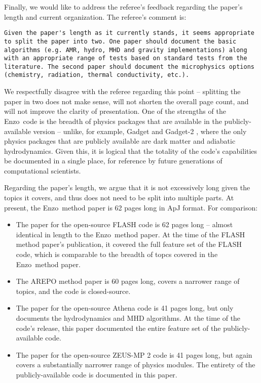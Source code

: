 \documentclass[11pt]{article}
\newcommand{\code}[1]{\textsf{#1}}
\newcommand{\enzo}{\code{Enzo}}
\begin{document}
Finally, we would like to address the referee's feedback regarding the
paper's length and current organization.  The referee's comment is:

\begin{verbatim} 
Given the paper's length as it currently stands, it seems appropriate
to split the paper into two. One paper should document the basic
algorithms (e.g. AMR, hydro, MHD and gravity implementations) along
with an appropriate range of tests based on standard tests from the
literature. The second paper should document the microphysics options
(chemistry, radiation, thermal conductivity, etc.).
\end{verbatim}

We respectfully disagree with the referee regarding this point --
splitting the paper in two does not make sense, will not shorten the
overall page count, and will not improve the clarity of presentation. One of the strengths
of the \enzo\ code is the breadth of physics packages that are
available in the publicly-available version -- unlike, for example,
Gadget and Gadget-2 \citep{2001NewA....6...79S, 2005MNRAS.364.1105S},
where the only physics packages that are publicly available are dark
matter and adiabatic hydrodynamics.  Given this, it is logical that
the totality of the code's capabilities be documented in a single
place, for reference by future generations of computational scientists.

Regarding the paper's length, we argue that it is not excessively long
given the topics it covers, and thus does not need to be split into
multiple parts.  At present, the \enzo\ method paper is 62 pages long
in ApJ format.
For comparison:

\begin{itemize}
\item The paper for the open-source FLASH code
\citep{2000ApJS..131..273F} is 62 pages long -- almost identical in
length to the \enzo\ method paper.  At the time of the FLASH method paper's
publication, it covered the full feature set of the FLASH code, which
is comparable to the breadth of topcs covered in the \enzo\ method
paper.

\item The AREPO method paper \citep{2010MNRAS.401..791S} is 60 pages
long, covers a narrower range of topics, and the code is
closed-source.

\item The paper for the open-source Athena code
\citep{2008ApJS..178..137S} is 41 pages long, but only documents the
hydrodynamics and MHD algorithms.  At the time of the code's release,
this paper documented the entire feature set of the publicly-available
code.

\item The paper for the open-source ZEUS-MP 2 code
\citep{2006ApJS..165..188H} is 41 pages long, but again covers a
substantially narrower range of physics modules.  The entirety of the
publicly-available code is documented in this paper.
\end{itemize}
\end{document}
